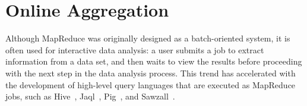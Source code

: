 



\section{Online Aggregation}
\label{ch:hop:sec:online}

Although MapReduce was originally designed as a batch-oriented system,
it is often used for interactive data analysis: a user submits a job
to extract information from a data set, and then waits to view the
results before proceeding with the next step in the data analysis
process. This trend has accelerated with the development of high-level
query languages that are executed as MapReduce jobs, such as
Hive~\cite{hive-vldb}, Jaql~\cite{jaql}, Pig~\cite{pig-sigmod}, and Sawzall~\cite{sawzall}.


